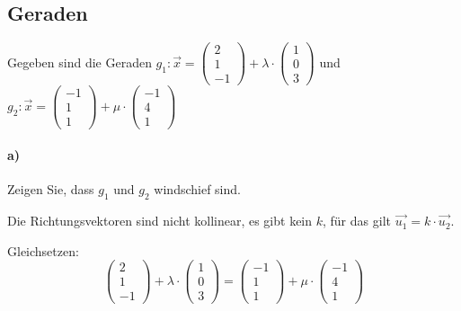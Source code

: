 \documentclass{ajc}
\numberwithin{equation}{subsection}
\begin{document}
	\subsection{Geraden}
	Gegeben sind die Geraden $g_1: \vec{x} = \left(\begin{array}{r} 2 \\ 1 \\ -1\end{array}\right) + \lambda \cdot \left(\begin{array}{r} 1 \\ 0 \\ 3\end{array}\right)$ und $g_2: \vec{x} = \left(\begin{array}{r} -1 \\ 1 \\ 1\end{array}\right) + \mu \cdot \left(\begin{array}{r} -1 \\ 4 \\ 1\end{array}\right)$
	
	\paragraph{a)} Zeigen Sie, dass $g_1$ und $g_2$ windschief sind.
	
	Die Richtungsvektoren sind nicht kollinear, es gibt kein $k$, für das gilt $\vec{u_1} =k \cdot \vec{u_2}$.
	
	Gleichsetzen:
	\begin{equation}
		\left(\begin{array}{r} 2 \\ 1 \\ -1\end{array}\right) + \lambda \cdot \left(\begin{array}{r} 1 \\ 0 \\ 3\end{array}\right) = \left(\begin{array}{r} -1 \\ 1 \\ 1\end{array}\right) + \mu \cdot \left(\begin{array}{r} -1 \\ 4 \\ 1\end{array}\right)
	\end{equation}
	
\end{document}

